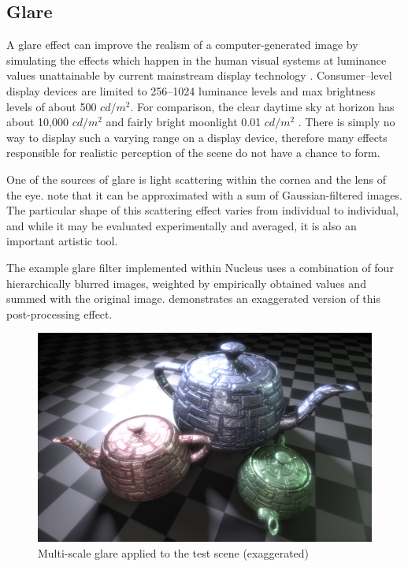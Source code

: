 \subsection{Glare}

A glare effect can improve the realism of a computer-generated image by simulating the effects which happen in the human visual systems at luminance values unattainable by current mainstream display technology \cite{Spencer95physicallybasedglare}. Consumer--level display devices are limited to 256--1024 luminance levels and max brightness levels of about 500 $cd/m^2$. For comparison, the clear daytime sky at horizon has about 10,000 $cd/m^2$ and fairly bright moonlight 0.01 $cd/m^2$ \cite{radiometryPhotometry}. There is simply no way to display such a varying range on a display device, therefore many effects responsible for realistic perception of the scene do not have a chance to form.

One of the sources of glare is light scattering within the cornea and the lens of the eye. \citet{Spencer95physicallybasedglare} note that it can be approximated with a sum of Gaussian-filtered images. The particular shape of this scattering effect varies from individual to individual, and while it may be evaluated experimentally and averaged, it is also an important artistic tool.

The example glare filter implemented within Nucleus uses a combination of four hierarchically blurred images, weighted by empirically obtained values and summed with the original image.  demonstrates an exaggerated version of this post-processing effect.

\begin{figure}[ht!]
  \centering
    \includegraphics[width=0.9\linewidth]{./Figures/postProc/glare.jpg}
    \caption[Glare]{Multi-scale glare applied to the test scene (exaggerated)}
  \label{fig:postProcGlare}
\end{figure}

